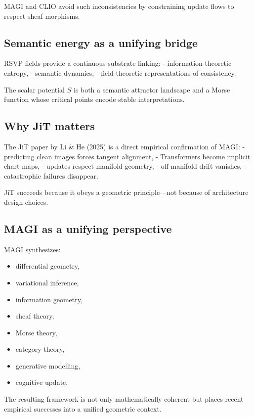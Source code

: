 \documentclass[11pt,a4paper,twocolumn]{article}
\begin{document}
MAGI and CLIO avoid such inconsistencies by constraining update flows
to respect sheaf morphisms.

\subsection{Semantic energy as a unifying bridge}

RSVP fields provide a continuous substrate linking:
- information-theoretic entropy,
- semantic dynamics,
- field-theoretic representations of consistency.

The scalar potential $S$ is both a semantic attractor landscape and a
Morse function whose critical points encode stable interpretations.

\subsection{Why JiT matters}

The JiT paper by Li \& He (2025) is a direct empirical confirmation of
MAGI:
- predicting clean images forces tangent alignment,
- Transformers become implicit chart maps,
- updates respect manifold geometry,
- off-manifold drift vanishes,
- catastrophic failures disappear.

JiT succeeds because it obeys a geometric principle—not because of
architecture design choices.

\subsection{MAGI as a unifying perspective}

MAGI synthesizes:
\begin{itemize}
\item differential geometry,
\item variational inference,
\item information geometry,
\item sheaf theory,
\item Morse theory,
\item category theory,
\item generative modelling,
\item cognitive update.
\end{itemize}

The resulting framework is not only mathematically coherent but places
recent empirical successes into a unified geometric context.


\end{document}
